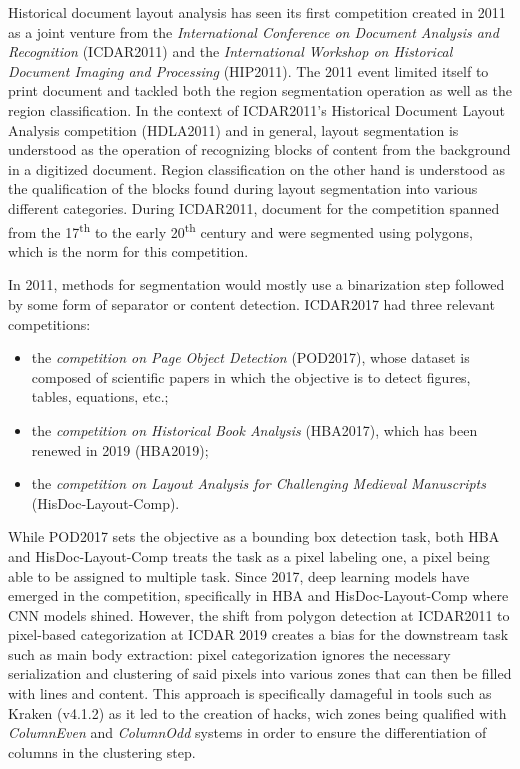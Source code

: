 \documentclass{jdmdh}
\begin{document}
Historical document layout analysis has seen its first competition created in 2011 as a joint venture from the \textit{International Conference on Document Analysis and Recognition} (ICDAR2011) and the \textit{International Workshop on Historical Document Imaging and Processing} (HIP2011). The 2011 event limited itself to print document and tackled both the region segmentation operation as well as the region classification. In the context of ICDAR2011's Historical Document Layout Analysis competition (HDLA2011) and in general, layout segmentation is understood as the operation of recognizing blocks of content from the background in a digitized document. Region classification on the other hand is understood as the qualification of the blocks found during layout segmentation into various different categories. During ICDAR2011, document for the competition spanned from the 17\textsuperscript{th} to the early 20\textsuperscript{th} century and were segmented using polygons, which is the norm for this competition.

In 2011, methods for segmentation would mostly use a binarization step followed by some form of separator or content detection. 
ICDAR2017 had three relevant competitions:
\begin{itemize}
    \item the \textit{competition on Page Object Detection} (POD2017), whose dataset is composed of scientific papers in which the objective is to detect figures, tables, equations, etc.;
    \item the \textit{competition on Historical Book Analysis} (HBA2017), which has been renewed in 2019 (HBA2019);
    \item the \textit{competition on Layout Analysis for Challenging Medieval Manuscripts} (HisDoc-Layout-Comp).
\end{itemize}

While POD2017 sets the objective as a bounding box detection task, both HBA and HisDoc-Layout-Comp treats the task as a pixel labeling one, a pixel being able to be assigned to multiple task. Since 2017, deep learning models have emerged in the competition, specifically in HBA and HisDoc-Layout-Comp where CNN models shined. However, the shift from polygon detection at ICDAR2011 to pixel-based categorization at ICDAR 2019 creates a bias for the downstream task such as main body extraction: pixel categorization ignores the necessary serialization and clustering of said pixels into various zones that can then be filled with lines and content. This approach is specifically damageful in tools such as Kraken (v4.1.2) as it led to the creation of hacks, wich zones being qualified with \textit{ColumnEven} and \textit{ColumnOdd} systems in order to ensure the differentiation of columns in the clustering step.
\end{document}
